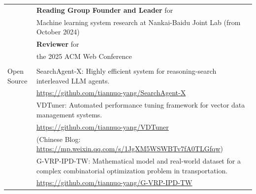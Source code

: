 \documentclass[letterpaper, 10pt]{article}
\begin{document}
\begin{longtable}{p{}p{}}
& \textbf{Reading Group Founder and Leader} for \\
& \quad\quad Machine learning system research at Nankai-Baidu Joint Lab (from October 2024)
\vspace{0.01\textwidth} \\

& \textbf{Reviewer} for \\
& \quad\quad the 2025 ACM Web Conference\\
& \\

\nohyphens{\textcolor{OliveGreen}{Open Source}}
& SearchAgent-X: Highly efficient system for reasoning-search interleaved LLM agents. \\
& \url{https://github.com/tiannuo-yang/SearchAgent-X}
\vspace{0.01\textwidth} \\

& VDTuner: Automated performance tuning framework for vector data management systems. \\
& \url{https://github.com/tiannuo-yang/VDTuner} \\
& (Chinese Blog: \url{https://mp.weixin.qq.com/s/1JgXM5WSWBTv7fA0TLGfqw})
\vspace{0.01\textwidth} \\

& G-VRP-IPD-TW: Mathematical model and real-world dataset for a complex combinatorial optimization problem in transportation. \\
& \url{https://github.com/tiannuo-yang/G-VRP-IPD-TW} \\


\end{longtable}
\end{document}
